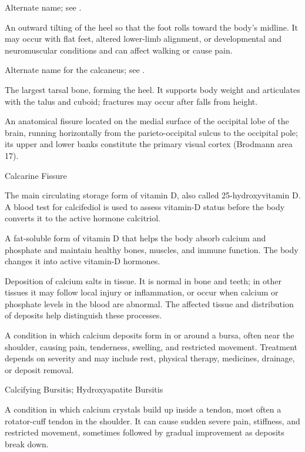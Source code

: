  Alternate name; see .

 An outward tilting of the heel so that the foot rolls toward the body's midline. It may occur with flat feet, altered lower-limb alignment, or developmental and neuromuscular conditions and can affect walking or cause pain.

 Alternate name for the calcaneus; see .

 The largest tarsal bone, forming the heel. It supports body weight and articulates with the talus and cuboid; fractures may occur after falls from height.

 An anatomical fissure located on the medial surface of the occipital lobe of the brain, running horizontally from the parieto-occipital sulcus to the occipital pole; its upper and lower banks constitute the primary visual cortex (Brodmann area 17).

\synonyms
Calcarine Fissure

 The main circulating storage form of vitamin D, also called 25-hydroxyvitamin D. A blood test for calcifediol is used to assess vitamin-D status before the body converts it to the active hormone calcitriol.

 A fat-soluble form of vitamin D that helps the body absorb calcium and phosphate and maintain healthy bones, muscles, and immune function. The body changes it into active vitamin-D hormones.

 Deposition of calcium salts in tissue. It is normal in bone and teeth; in other tissues it may follow local injury or inflammation, or occur when calcium or phosphate levels in the blood are abnormal. The affected tissue and distribution of deposits help distinguish these processes.

 A condition in which calcium deposits form in or around a bursa, often near the shoulder, causing pain, tenderness, swelling, and restricted movement. Treatment depends on severity and may include rest, physical therapy, medicines, drainage, or deposit removal.

\synonyms
Calcifying Bursitis; Hydroxyapatite Bursitis

 A condition in which calcium crystals build up inside a tendon, most often a rotator-cuff tendon in the shoulder. It can cause sudden severe pain, stiffness, and restricted movement, sometimes followed by gradual improvement as deposits break down.

